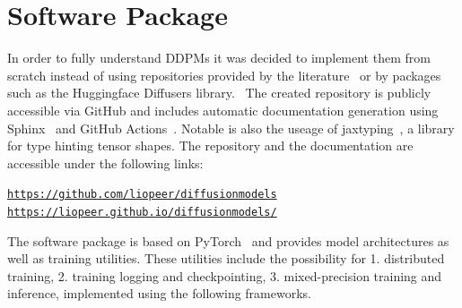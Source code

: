 \section{Software Package}
In order to fully understand DDPMs it was decided to implement them from scratch instead of using repositories provided by the literature~\autocite{nichol2021improved} or by packages such as the Huggingface Diffusers library.~\autocite{huggingfacediffusers} The created repository is publicly accessible via GitHub and includes automatic documentation generation using Sphinx~\autocite{sphinx} and GitHub Actions~\autocite{githubactions}. Notable is also the useage of jaxtyping~\autocite{jaxtyping}, a library for type hinting tensor shapes. The repository and the documentation are accessible under the following links:
\begin{center}
    \hyperlink{https://github.com/liopeer/diffusionmodels}{\texttt{https://github.com/liopeer/diffusionmodels}}\\
    \hyperlink{https://liopeer.github.io/diffusionmodels/}{\texttt{https://liopeer.github.io/diffusionmodels/}}
\end{center}
The software package is based on PyTorch~\autocite{paszke2019pytorch} and provides model architectures as well as training utilities. These utilities include the possibility for 1. distributed training, 2. training logging and checkpointing, 3. mixed-precision training and inference, implemented using the following frameworks.
